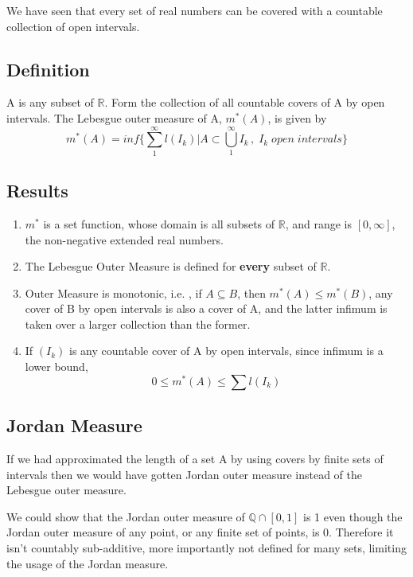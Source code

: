 \documentclass{article}
\begin{document}
We have seen that every set of real numbers can be covered with a countable collection of open intervals.

\subsection{Definition}

A is any subset of $\mathbb{R}$. Form the collection of all countable covers of A by open intervals. The Lebesgue outer measure of A, $m^*(A)$, is given by
$$m^*(A)= inf\Big\{\sum_{1}^{\infty}l(I_k)| A \subset \bigcup_{1}^{\infty} I_k \, , \; I_k \; open \; intervals\Big\}$$

\subsection{Results}
\begin{enumerate}
    \item $m^*$ is a set function, whose domain is all subsets of $\mathbb{R}$, and range is $[0,\infty]$, the non-negative extended real numbers. 
    
    \item The Lebesgue Outer Measure is defined for \textbf{every} subset of $\mathbb{R}$.
    
    \item Outer Measure is monotonic, i.e. , if $A \subseteq B$, then $m^*(A) \leq m^*(B)$, any cover of B by open intervals is also a cover of A, and the latter infimum is taken over a larger collection than the former. 

    \item If $(I_k)$ is any countable cover of A by open intervals, since infimum is a lower bound,$$ 0 \leq m^*(A) \leq \sum l(I_k)$$
    


\end{enumerate}

\subsection{Jordan Measure}

If we had approximated the length of a set A by using covers by finite sets of intervals then we would have gotten Jordan outer measure instead of the Lebesgue outer measure. 

We could show that the Jordan outer measure of $ \mathbb{Q} \cap[0,1]$ is 1 even though the Jordan outer measure of any point, or any finite set of points, is 0. Therefore it isn't countably sub-additive, more importantly not defined for many sets, limiting the usage of the Jordan measure.
\end{document}
